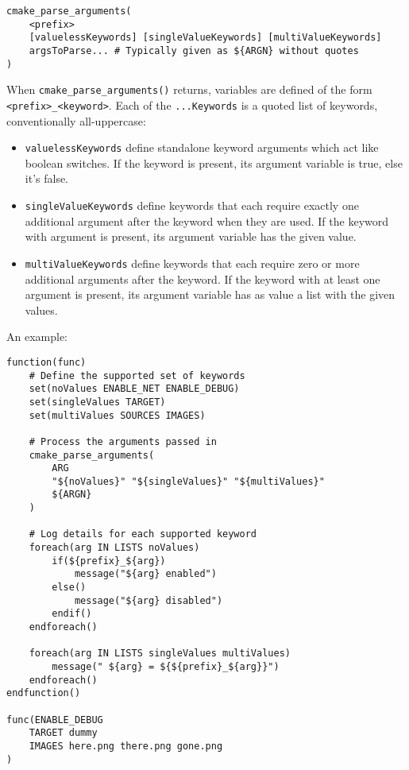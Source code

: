 \documentclass[8pt, table, xcdraw]{article}%
\begin{document}
\begin{lstlisting}
cmake_parse_arguments(
    <prefix>
    [valuelessKeywords] [singleValueKeywords] [multiValueKeywords]
    argsToParse... # Typically given as ${ARGN} without quotes
)
\end{lstlisting}

When \lstinline{cmake_parse_arguments()} returns, variables are defined of the form \lstinline{<prefix>_<keyword>}. Each of the \lstinline{...Keywords} is a quoted list of keywords, conventionally all-uppercase:

\begin{itemize}
    \item \lstinline{valuelessKeywords} define standalone keyword arguments which act like boolean switches. If the keyword is present, its argument variable is true, else it's false.
    \item \lstinline{singleValueKeywords} define keywords that each require exactly one additional argument after the keyword when they are used. If the keyword with argument is present, its argument variable has the given value.
    \item \lstinline{multiValueKeywords} define keywords that each require zero or more additional arguments after the keyword. If the keyword with at least one argument is present, its argument variable has as value a list with the given values.
\end{itemize}

An example:

\begin{lstlisting}
function(func)
    # Define the supported set of keywords
    set(noValues ENABLE_NET ENABLE_DEBUG)
    set(singleValues TARGET)
    set(multiValues SOURCES IMAGES)
    
    # Process the arguments passed in
    cmake_parse_arguments(
        ARG
        "${noValues}" "${singleValues}" "${multiValues}"
        ${ARGN}
    )
    
    # Log details for each supported keyword
    foreach(arg IN LISTS noValues)
        if(${prefix}_${arg})
            message("${arg} enabled")
        else()
            message("${arg} disabled")
        endif()
    endforeach()
    
    foreach(arg IN LISTS singleValues multiValues)
        message(" ${arg} = ${${prefix}_${arg}}")
    endforeach()
endfunction()

func(ENABLE_DEBUG
    TARGET dummy
    IMAGES here.png there.png gone.png
)
\end{lstlisting}
\end{document}
